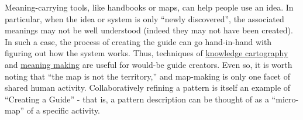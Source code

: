 Meaning-carrying tools, like handbooks or maps, can help people use an
idea. In particular, when the idea or system is only ``newly
discovered'', the associated meanings may not be well understood (indeed
they may not have been created). In such a case, the process of creating
the guide can go hand-in-hand with figuring out how the system works.
Thus, techniques of \href{http://knowledgecartography.org/}{knowledge
cartography} and
\href{http://www.hitl.washington.edu/publications/r-97-47/two.html}{meaning
making} are useful for would-be guide creators. Even so, it is worth
noting that ``the map is not the territory,'' and map-making is only one
facet of shared human activity. Collaboratively refining a pattern is
itself an example of ``Creating a Guide'' - that is, a pattern
description can be thought of as a ``micro-map'' of a specific activity.
